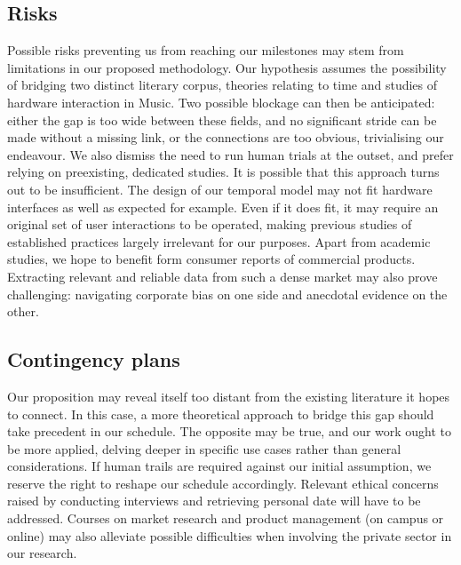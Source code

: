 \documentclass[journal,onecolumn]{IEEEtran}
\begin{document}
\subsection{Risks}
Possible risks preventing us from reaching our milestones may stem from limitations in our proposed methodology. Our hypothesis assumes the possibility of bridging two distinct literary corpus, theories relating to time and studies of hardware interaction in Music. Two possible blockage can then be anticipated: either the gap is too wide between these fields, and no significant stride can be made without a missing link, or the connections are too obvious, trivialising our endeavour. We also dismiss the need to run human trials at the outset, and prefer relying on preexisting, dedicated studies. It is possible that this approach turns out to be insufficient. The design of our temporal model may not fit hardware interfaces as well as expected for example. Even if it does fit, it may require an original set of user interactions to be operated, making previous studies of established practices largely irrelevant for our purposes. Apart from academic studies, we hope to benefit form consumer reports of commercial products. Extracting relevant and reliable data from such a dense market may also prove challenging: navigating corporate bias on one side and anecdotal evidence on the other.

\subsection{Contingency plans}
Our proposition may reveal itself too distant from the existing literature it hopes to connect. In this case, a more theoretical approach to bridge this gap should take precedent in our schedule. The opposite may be true, and our work ought to be more applied, delving deeper in specific use cases rather than general considerations. If human trails are required against our initial assumption, we reserve the right to reshape our schedule accordingly. Relevant ethical concerns raised by conducting interviews and retrieving personal date will have to be addressed. Courses on market research and product management (on campus or online) may also alleviate possible difficulties when involving the private sector in our research.
\end{document}
